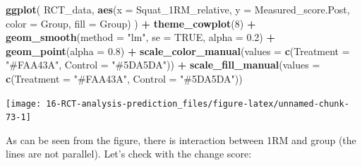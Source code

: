 \documentclass[
]{book}
\newenvironment{Shaded}{\begin{snugshade}}{\end{snugshade}}
\newcommand{\DataTypeTok}[1]{\textcolor[rgb]{0.13,0.29,0.53}{#1}}
\newcommand{\DecValTok}[1]{\textcolor[rgb]{0.00,0.00,0.81}{#1}}
\newcommand{\FloatTok}[1]{\textcolor[rgb]{0.00,0.00,0.81}{#1}}
\newcommand{\KeywordTok}[1]{\textcolor[rgb]{0.13,0.29,0.53}{\textbf{#1}}}
\newcommand{\NormalTok}[1]{#1}
\newcommand{\OperatorTok}[1]{\textcolor[rgb]{0.81,0.36,0.00}{\textbf{#1}}}
\newcommand{\OtherTok}[1]{\textcolor[rgb]{0.56,0.35,0.01}{#1}}
\newcommand{\StringTok}[1]{\textcolor[rgb]{0.31,0.60,0.02}{#1}}
\begin{document}
\begin{Shaded}
\begin{Highlighting}[]
\KeywordTok{ggplot}\NormalTok{(}
\NormalTok{  RCT\_data,}
  \KeywordTok{aes}\NormalTok{(}\DataTypeTok{x =}\NormalTok{ Squat\_1RM\_relative, }\DataTypeTok{y =}\NormalTok{ Measured\_score.Post, }\DataTypeTok{color =}\NormalTok{ Group, }\DataTypeTok{fill =}\NormalTok{ Group)}
\NormalTok{) }\OperatorTok{+}
\StringTok{  }\KeywordTok{theme\_cowplot}\NormalTok{(}\DecValTok{8}\NormalTok{) }\OperatorTok{+}
\StringTok{  }\KeywordTok{geom\_smooth}\NormalTok{(}\DataTypeTok{method =} \StringTok{"lm"}\NormalTok{, }\DataTypeTok{se =} \OtherTok{TRUE}\NormalTok{, }\DataTypeTok{alpha =} \FloatTok{0.2}\NormalTok{) }\OperatorTok{+}
\StringTok{  }\KeywordTok{geom\_point}\NormalTok{(}\DataTypeTok{alpha =} \FloatTok{0.8}\NormalTok{) }\OperatorTok{+}
\StringTok{  }\KeywordTok{scale\_color\_manual}\NormalTok{(}\DataTypeTok{values =} \KeywordTok{c}\NormalTok{(}\DataTypeTok{Treatment =} \StringTok{"\#FAA43A"}\NormalTok{, }\DataTypeTok{Control =} \StringTok{"\#5DA5DA"}\NormalTok{)) }\OperatorTok{+}
\StringTok{  }\KeywordTok{scale\_fill\_manual}\NormalTok{(}\DataTypeTok{values =} \KeywordTok{c}\NormalTok{(}\DataTypeTok{Treatment =} \StringTok{"\#FAA43A"}\NormalTok{, }\DataTypeTok{Control =} \StringTok{"\#5DA5DA"}\NormalTok{))}
\end{Highlighting}
\end{Shaded}

\begin{center}\texttt{[image: 16-RCT-analysis-prediction\_files/figure-latex/unnamed-chunk-73-1]} \end{center}

As can be seen from the figure, there is interaction between 1RM and group (the lines are not parallel). Let's check with the change score:
\end{document}
